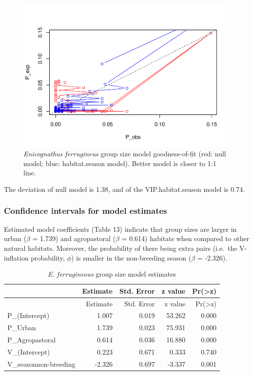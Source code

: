 \documentclass[]{article}
\begin{document}
\begin{figure}[H]
\includegraphics{Patagonia_parrots_density_analysis_files/figure-latex/unnamed-chunk-16-1} \caption{\textit{Enicognathus ferrugineus} group size model goodness-of-fit (red: null model; blue: habitat.season model). Better model is closer to 1:1 line.}\label{fig:unnamed-chunk-16}
\end{figure}

The deviation of null model is 1.38, and of the VIP.habitat.season model
is 0.74.

\subsubsection{Confidence intervals for model
estimates}\label{confidence-intervals-for-model-estimates}

Estimated model coefficients (Table 13) indicate that group sizes are
larger in urban (\(\beta\) = 1.739) and agropastoral (\(\beta\) = 0.614)
habitats when compared to other natural habitats. Moreover, the
probability of there being extra pairs (i.e.~the V-inflation
probability, \(\phi\)) is smaller in the non-breeding season (\(\beta\)
= -2.326).

\begin{longtable}[]{@{}lrrrr@{}}
\caption{\textit{E. ferrugineous} group size model
estimates}\tabularnewline
\toprule
& Estimate & Std. Error & z value &
Pr(\textgreater{}\textbar{}z\textbar{})\tabularnewline
\midrule
\endfirsthead
\toprule
& Estimate & Std. Error & z value &
Pr(\textgreater{}\textbar{}z\textbar{})\tabularnewline
\midrule
\endhead
P\_(Intercept) & 1.007 & 0.019 & 53.262 & 0.000\tabularnewline
P\_Urban & 1.739 & 0.023 & 75.931 & 0.000\tabularnewline
P\_Agropastoral & 0.614 & 0.036 & 16.880 & 0.000\tabularnewline
V\_(Intercept) & 0.223 & 0.671 & 0.333 & 0.740\tabularnewline
V\_seasonnon-breeding & -2.326 & 0.697 & -3.337 & 0.001\tabularnewline
\bottomrule
\end{longtable}
\end{document}
